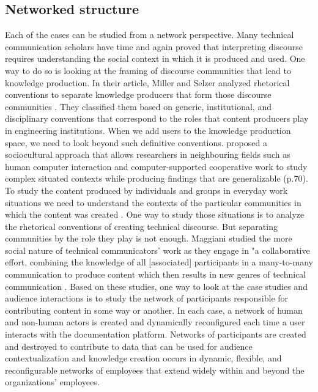 \subsection{Networked structure}
Each of the cases can be studied from a network perspective. Many technical communication scholars have time and again proved that interpreting discourse requires understanding the social context in which it is produced and used. One way to do so is looking at the framing of discourse communities that lead to knowledge production. In their article, Miller and Selzer analyzed rhetorical conventions to separate knowledge producers that form those discourse communities \cite{miller1985special}. They classified them based on generic, institutional, and disciplinary conventions that correspond to the roles that content producers play in engineering institutions. When we add users to the knowledge production space, we need to look beyond such definitive conventions. \textcite{nardi1996context} proposed a sociocultural approach that allows researchers in neighbouring fields such as human computer interaction and computer-supported cooperative work to study complex situated contexts while producing findings that are generalizable (p.70). To study the content produced by individuals and groups in everyday work situations we need to understand the contexts of the particular communities in which the content was created \cite{miller1985special}. One way to study those situations is to analyze the rhetorical conventions of creating technical discourse. But separating communities by the role they play is not enough. Maggiani studied the more social nature of technical communicators' work as they engage in  "a collaborative effort, combining the knowledge of all [associated] participants in a many-to-many communication to produce content which then results in new genres of  technical communication \cite{maggiani2009cloud}. Based on these studies, one way to look at the case studies and audience interactions is to study the network of participants responsible for contributing content in some way or another. In each case, a network of human and non-human actors is created and dynamically reconfigured each time a user interacts with the documentation platform. Networks of participants are created and destroyed to contribute to data that can be used for audience contextualization and knowledge creation occurs in dynamic, flexible, and reconfigurable networks of employees \cite{castells_2020} that extend widely within and beyond the organizations' employees.

